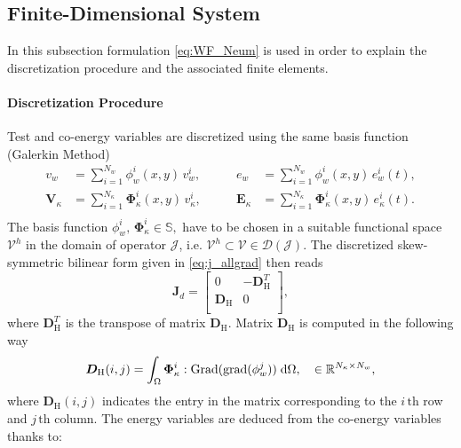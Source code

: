 \documentclass[letterpaper, 10 pt, conference]{ieeeconf}
\begin{document}
\subsection{Finite-Dimensional System}
\label{subsec:finPHs}
In this subsection formulation \eqref{eq:WF_Neum} is used in order to explain the discretization procedure and the associated finite elements. 
\paragraph{Discretization Procedure}
Test and co-energy variables are discretized using the same basis function (Galerkin Method)
\begin{equation}
\begin{aligned}
v_w &= \sum_{i = 1}^{N_w} \phi_w^i(x,y) \, v_w^i, \\
\bm{V}_\kappa &= \sum_{i = 1}^{N_\kappa} \bm\Phi_\kappa^i(x,y) \, v_\kappa^i,\\
\end{aligned} \qquad 
\begin{aligned}
e_w &= \sum_{i = 1}^{N_w} \phi_w^i(x,y) \, e_w^i(t), \\
\bm{E}_\kappa &= \sum_{i = 1}^{N_\kappa} \bm\Phi_\kappa^i(x,y) \, e_\kappa^i(t).\\
\end{aligned}
\end{equation}
The basis function $\phi_w^i, \, \bm\Phi_\kappa^i \in \mathbb{S}, $ have to be chosen in a suitable functional space $\mathcal{V}^h$ in the domain of operator $\mathcal{J}$, i.e. $\mathcal{V}^h \subset \mathcal{V} \in \mathcal{D}(\mathcal{J})$. The discretized skew-symmetric bilinear form given in \eqref{eq:j_allgrad} then reads
\begin{equation}
\bm{J}_d = 
\begin{bmatrix}
0 & -\bm{D}_{\mathrm{H}}^T \\
\bm{D}_{\mathrm{H}} & 0\\
\end{bmatrix},
\end{equation}
where $\bm{D}_{\mathrm{H}}^T$ is the transpose of matrix $\bm{D}_{\mathrm{H}}$. Matrix $\bm{D}_{\mathrm{H}}$ is computed in the following way
\begin{equation}
\bm{D}_{\mathrm{H}}(i,j) = \int_{\Omega} \bm{\Phi}_{\kappa}^i : \mathrm{Grad}(\mathrm{grad}(\phi_w^j)) \d\Omega, \quad \in \mathbb{R}^{N_\kappa \times N_w},
\end{equation}
where $\bm{D}_{\mathrm{H}}(i,j)$ indicates the entry in the matrix corresponding to the $i \, {\text{th}}$ row and $j \,{\text{th}}$ column. The energy variables are deduced from the co-energy variables  thanks to:
\end{document}
